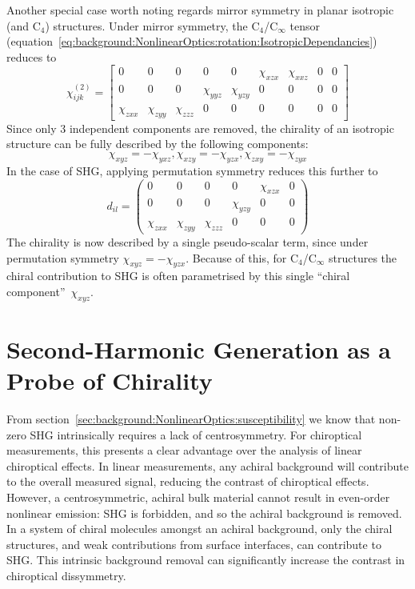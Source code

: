 Another special case worth noting regards mirror symmetry in planar isotropic (and C$_4$) structures. Under mirror symmetry, the C$_4$/C$_\infty$ tensor (equation~\ref{eq:background:NonlinearOptics:rotation:IsotropicDependancies}) reduces to
\begin{equation}\label{eq:background:NonlinearOptics:mirror:IsotropicMirrorChi}
	\chi^{(2)}_{ijk} =
	\begin{bmatrix}
		0 & 0 & 0 & 0 & 0 & \chi_{xzx} & \chi_{xxz} & 0 & 0\\ 
		0 & 0 & 0 & \chi_{yyz} & \chi_{yzy} & 0 & 0 & 0 & 0\\ 
		\chi_{zxx} & \chi_{zyy} & \chi_{zzz} & 0 & 0 & 0 & 0 & 0 & 0
	\end{bmatrix}
\end{equation}
Since only 3 independent components are removed, the chirality of an isotropic structure can be fully described by the following components:
\begin{equation}\label{eq:background:NonlinearOptics:mirror:IsoChiralComponents}
\chi_{xyz} = -\chi_{yxz}, \chi_{xzy} = -\chi_{yzx}, \chi_{zxy} = -\chi_{zyx} 
\end{equation}
In the case of SHG, applying permutation symmetry reduces this further to
\begin{equation}\label{eq:background:NonlinearOptics:mirror:ReducedIsoChiral}
	d_{il} = 
	\begin{pmatrix}
		0 & 0 & 0 & 0 & \chi_{xzx} & 0\\ 
		0 & 0 & 0 & \chi_{yzy} & 0 & 0\\ 
		\chi_{zxx} & \chi_{zyy} & \chi_{zzz} & 0 & 0 & 0
	\end{pmatrix} 
\end{equation}
The chirality is now described by a single pseudo-scalar term, since under permutation symmetry $\chi_{xyz} = -\chi_{yzx}$. Because of this, for C$_4$/C$_\infty$ structures the chiral contribution to SHG is often parametrised by this single ``chiral component''~$\chi_{xyz}$.

\section{Second-Harmonic Generation as a Probe of Chirality}\label{sec:background:NonlinearOptics:chirality}

From section~\ref{sec:background:NonlinearOptics:susceptibility} we know that non-zero SHG intrinsically requires a lack of centrosymmetry. For chiroptical measurements, this presents a clear advantage over the analysis of linear chiroptical effects. In linear measurements, any achiral background will contribute to the overall measured signal, reducing the contrast of chiroptical effects. However, a centrosymmetric, achiral bulk material cannot result in even-order nonlinear emission: SHG is forbidden, and so the achiral background is removed. In a system of chiral molecules amongst an achiral background, only the chiral structures, and weak contributions from surface interfaces, can contribute to SHG. This intrinsic background removal can significantly increase the contrast in chiroptical dissymmetry.

